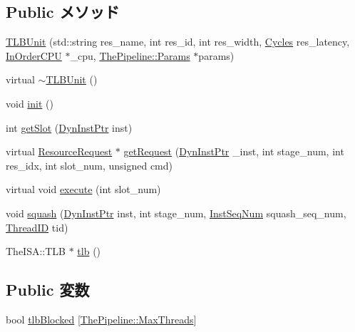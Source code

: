 \subsection*{Public メソッド}
\begin{DoxyCompactItemize}
\item 
\hyperlink{classTLBUnit_a08b80cd9315a97384c41fcab5e237316}{TLBUnit} (std::string res\_\-name, int res\_\-id, int res\_\-width, \hyperlink{classCycles}{Cycles} res\_\-latency, \hyperlink{classInOrderCPU}{InOrderCPU} $\ast$\_\-cpu, \hyperlink{namespaceThePipeline_ab62ca16eeca26566ad2422b5df4943ce}{ThePipeline::Params} $\ast$params)
\item 
virtual \hyperlink{classTLBUnit_a715a453817a86ac44d004bbb01e58dbb}{$\sim$TLBUnit} ()
\item 
void \hyperlink{classTLBUnit_a02fd73d861ef2e4aabb38c0c9ff82947}{init} ()
\item 
int \hyperlink{classTLBUnit_ab3ba2ee95c723c8c056db0a1f2a6dfd3}{getSlot} (\hyperlink{classRefCountingPtr}{DynInstPtr} inst)
\item 
virtual \hyperlink{classResourceRequest}{ResourceRequest} $\ast$ \hyperlink{classTLBUnit_a98b2e8ae07f180e62be1d03beae400f9}{getRequest} (\hyperlink{classRefCountingPtr}{DynInstPtr} \_\-inst, int stage\_\-num, int res\_\-idx, int slot\_\-num, unsigned cmd)
\item 
virtual void \hyperlink{classTLBUnit_a7b7fff82f8c9cbdb02add1346f60bb9e}{execute} (int slot\_\-num)
\item 
void \hyperlink{classTLBUnit_a52235c5e3d912452f254dc45f1496fd2}{squash} (\hyperlink{classRefCountingPtr}{DynInstPtr} inst, int stage\_\-num, \hyperlink{inst__seq_8hh_a258d93d98edaedee089435c19ea2ea2e}{InstSeqNum} squash\_\-seq\_\-num, \hyperlink{base_2types_8hh_ab39b1a4f9dad884694c7a74ed69e6a6b}{ThreadID} tid)
\item 
TheISA::TLB $\ast$ \hyperlink{classTLBUnit_a3cf8b27760278d20d4aa9463f52a2d95}{tlb} ()
\end{DoxyCompactItemize}
\subsection*{Public 変数}
\begin{DoxyCompactItemize}
\item 
bool \hyperlink{classTLBUnit_a1e5ca2b940e91b19e93867cc549fe65d}{tlbBlocked} \mbox{[}\hyperlink{namespaceThePipeline_ac9c0bbe9cf27d93e08ea8ccc4096e633}{ThePipeline::MaxThreads}\mbox{]}
\end{DoxyCompactItemize}
